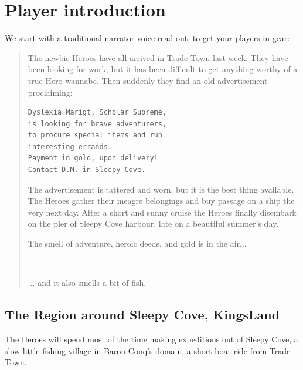 \documentclass[11pt, twoside, titlepage, a4paper]{report}
\renewcommand{\chaptermark}[1]{\markboth{#1}{}}
\newenvironment{readoutloud}%
{\begin{quote}\begin{itshape}}%
{\end{itshape}\end{quote}}%
\begin{document}


\clearpage
{}
\section*{Player introduction}
\chaptermark{player intro}

We start with a traditional narrator voice read out, to get your players in gear:

\begin{readoutloud}
The newbie Heroes have all arrived in Trade Town last week. They have been looking for work, but it has been difficult to get anything worthy of a true Hero wannabe.
Then suddenly they find an old advertisement proclaiming:

\begin{center}
\begin{verbatim}
Dyslexia Marigt, Scholar Supreme,
is looking for brave adventurers,
to procure special items and run
interesting errands.
Payment in gold, upon delivery!
Contact D.M. in Sleepy Cove.
\end{verbatim}
\end{center}

The advertisement is tattered and worn, but it is the best thing available. The Heroes gather their meagre belongings and buy passage on a ship the very next day. After a short and sunny cruise the Heroes finally disembark on the pier of Sleepy Cove harbour, late on a beautiful summer's day.

The smell of adventure, heroic deeds, and gold is in the air...

\

... and it also smells a bit of fish.
\end{readoutloud}



\clearpage
\subsection*{The Region around Sleepy Cove, KingsLand}
The Heroes will spend most of the time making expeditions out of Sleepy Cove, a slow little fishing village in Baron Conq's domain, a short boat ride from Trade Town.
\end{document}
